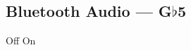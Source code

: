 \subsection[Bluetooth Audio]{Bluetooth Audio --- \UiKey{\SET}G$\flat$5}









































Off
On

